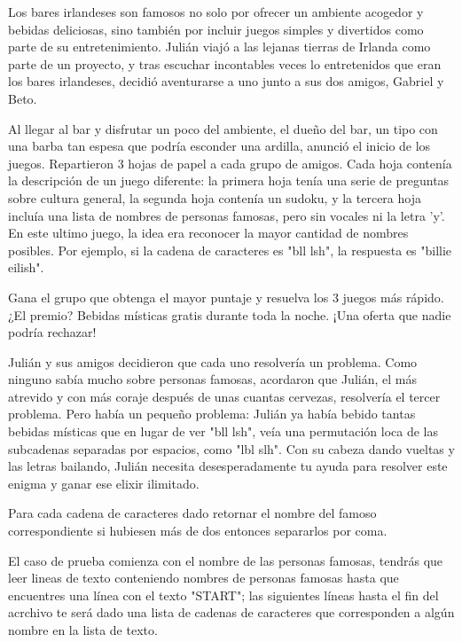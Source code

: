
Los bares irlandeses son famosos no solo por ofrecer un ambiente acogedor y bebidas deliciosas, sino también por incluir juegos simples y divertidos como parte de su entretenimiento. Julián viajó a las lejanas tierras de Irlanda como parte de un proyecto, y tras escuchar incontables veces lo entretenidos que eran los bares irlandeses, decidió aventurarse a uno junto a sus dos amigos, Gabriel y Beto.


Al llegar al bar y disfrutar un poco del ambiente, el dueño del bar, un tipo con una barba tan espesa que podría esconder una ardilla, anunció el inicio de los juegos. Repartieron $3$ hojas de papel a cada grupo de amigos. Cada hoja contenía la descripción de un juego diferente: la primera hoja tenía una serie de preguntas sobre cultura general, la segunda hoja contenía un sudoku, y la tercera hoja incluía una lista de nombres de personas famosas, pero sin vocales ni la letra 'y'. En este ultimo juego, la idea era reconocer la mayor cantidad de nombres posibles. Por ejemplo, si la cadena de caracteres es "bll lsh", la respuesta es "billie eilish".


Gana el grupo que obtenga el mayor puntaje y resuelva los 3 juegos más rápido. ¿El premio? Bebidas místicas gratis durante toda la noche. ¡Una oferta que nadie podría rechazar!


Julián y sus amigos decidieron que cada uno resolvería un problema. Como ninguno sabía mucho sobre personas famosas, acordaron que Julián, el más atrevido y con más coraje después de unas cuantas cervezas, resolvería el tercer problema. Pero había un pequeño problema: Julián ya había bebido tantas bebidas místicas que en lugar de ver "bll lsh", veía una permutación loca de las subcadenas separadas por espacios, como "lbl slh". Con su cabeza dando vueltas y las letras bailando, Julián necesita desesperadamente tu ayuda para resolver este enigma y ganar ese elixir ilimitado.


Para cada cadena de caracteres dado retornar el nombre del famoso correspondiente si hubiesen más de dos entonces separarlos por coma.


El caso de prueba comienza con el nombre de las personas famosas, tendrás que leer lineas de texto conteniendo nombres de personas famosas hasta que encuentres una línea con el texto "START"; las siguientes líneas hasta el fin del acrchivo te será dado una lista de cadenas de caracteres que corresponden a algún nombre en la lista de texto.

